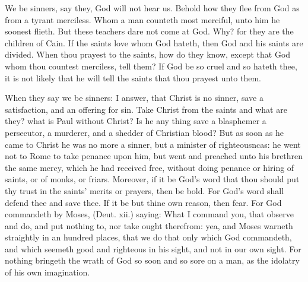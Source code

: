 \documentclass{custom}
\begin{document}
We be sinners, say they, God will not hear us. Behold 
how they flee from God as from a tyrant merciless. Whom 
a man counteth most merciful, unto him he soonest flieth. 
But these teachers dare not come at God. Why? for 
they are the children of Cain. If the saints love whom 
God hateth, then God and his saints are divided. When 
thou prayest to the saints, how do they know, except that
God whom thou countest merciless, tell them? If God be
so cruel and so hateth thee, it is not likely that he will tell
the saints that thou prayest unto them. 

When they say we be sinners: I answer, that Christ is 
no sinner, save a satisfaction, and an offering for sin. 
Take Christ from the saints and what are they? what is 
Paul without Christ? Is he any thing save a blasphemer 
a persecutor, a murderer, and a shedder of Christian blood? 
But as soon as he came to Christ he was no more a sinner, 
but a minister of righteousncas: he went not to Rome to 
take penance upon him, but went and preached unto his 
brethren the same mercy, which he had received free, 
without doing penance or hiring of saints, or of monks, or 
friars. Moreover, if it be God's word that thou should 
put thy trust in the saints' merits or prayers, then be bold. 
For God's word shall defend thee and save thee. If it be 
but thine own reason, then fear. For God commandeth 
by Moses, (Deut. xii.) saying: What I command you, 
that observe and do, and put nothing to, nor take ought 
therefrom: yea, and Moses warneth straightly in an hundred 
places, that we do that only which God commandeth, and 
which seemeth good and righteous in his sight, and not in
our own sight. For nothing bringeth the wrath of God 
so soon and so sore on a man, as the idolatry of his own 
imagination. 
\end{document}

